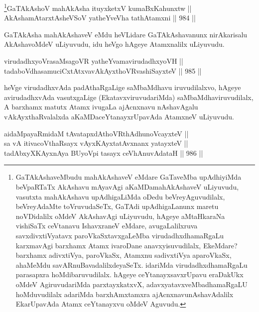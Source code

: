 \begin{shl}
\footnote{GaTAkAshaveMbudu mahAkAshaveV eMdare GaTaveMba upAdhiyiMda beVpaRTaTx AkAshavu mAyavAgi aKaMDamahAkAshaveV uLiyuvudu, vasutxta mahAkAshavu upAdhigaLiMda oDedu beVreyAguvudilalx, beVreyAdaMte toVruvudaSeTx, GaTAdi upAdhigaLanunx maretu noVDidalilx oMdeV AkAshavAgi uLiyuvudu, hAgeye aMtaHkaraNa vishiSaTx ceVtanavu IshavxraneV eMdare, avugaLalilxruva savxdivxtiVyatavx paroVkaSxtavxgaLeMba virudadhxdhamaRgaLu karxmavAgi barxhamx Atamx ivaroDane anavxyisuvudilalx, EkeMdare? barxhamx adivxtiVya, paroVkaSx, Atamxnu sadivxtiVya aparoVkaSx, ahaMeMdu savARnuBavadalilxdeyaSeTx. idariMda virudadhxdhamaRgaLu parasapxra hoMdibaruvudilalx. hAgeye ceYtanayxsavxrUpavu eraDakUkx oMdeV AgiruvudariMda parxtayxkatxvX, adavxyatavxveMbadhamaRgaLU hoMduvudilalx adariMda barxhAmxtamxra ajAcnxnavunAshavAdalilx EkarUpavAda Atamx ceYtanayxvu oMdeV Aguvudu.}GaTAkAshoV mahAkAsha ituyxketxV kumaBxKahunxtw || \\
AkAshamAtarxtAsheVSoV yatheYveVha tathA\s \s tamxni \hfill || 984 ||  
\end{shl}

\begin{artha}
GaTAkAsha mahAkAshaveV eMdu heVLidare GaTAkAshavanunx nirAkarisalu AkAshavoMdeV uLiyuvudu, idu heVgo hAgeye Atamxnalilx uLiyuvudu.
\end{artha}


\begin{shl}
virudadhxyoVrasaMsagoVR yatheYvamavirudadhxyoVH || \\
tadaboVdhasamuciCxtAtxvavAkAyxthoVR\s vashiSayxteV \hfill || 985 ||  
\end{shl}

\begin{artha}
heVge virudadhxvAda padAthaRgaLige saMbaMdhavu iruvudilalxvo, hAgeye avirudadhxvAda vasutxgaLige (EkatavxviruvudariMda) saMbaMdhaviruvudilalx, A barxhamx matutx Atamx ivugaLa ajAcnxnavu nAshavAgalu vAkAyxthaRvalalxda aKaMDaceYtanayxrUpavAda AtamxneV uLiyuvudu.
\end{artha}


\begin{shl}
aidaMpayaRmidaM tAvatapxdAthoVR\s thAdhunoVcayxteV || \\
sa vA itivacoVthaRsayx vAyxKAyxtatAvxnanx yatayxteV || \\
tadAbxyXKAyxnAya BUyoV\s pi tasayx ceVhAnuvAdataH \hfill || 986 ||  
\end{shl}

